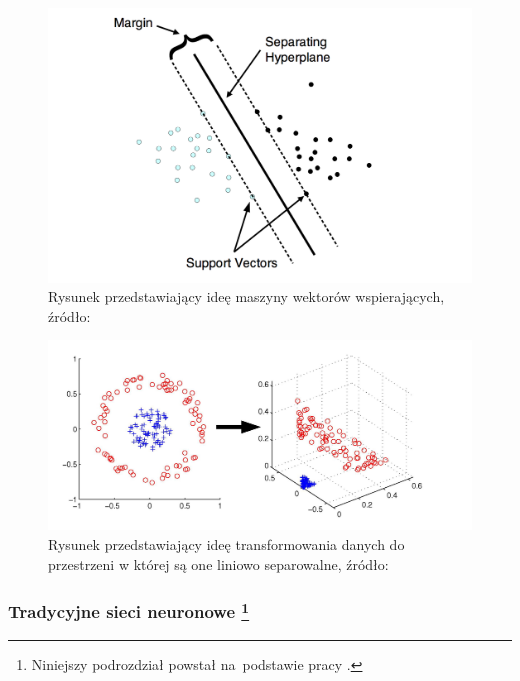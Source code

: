 \begin{figure}[ht!]
\centering
\includegraphics[scale=0.8]{res/svm1.png}
\caption[Caption for LOF]{Rysunek przedstawiający ideę maszyny wektorów wspierających, źródło:\cite{svm2} \label{svmIdea}}
\end{figure} 

\begin{figure}[ht!]
\centering
\includegraphics[scale=0.6]{res/svm2.png}
\caption[Caption for LOF]{Rysunek przedstawiający ideę transformowania danych do przestrzeni w której są one liniowo separowalne, źródło:\cite{svmKernel} \label{svmKernel}}
\end{figure} 

\subsubsection[Tradycyjne sieci neuronowe]{Tradycyjne sieci neuronowe \footnote{Niniejszy podrozdział powstał na~podstawie pracy \cite{tadeusiewicz}. }}

